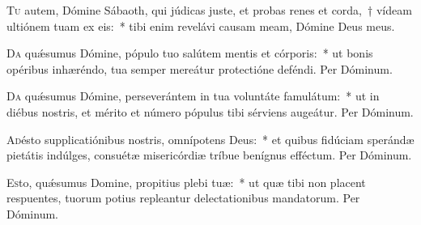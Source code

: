\documentclass[vesperale_romanum.tex]{subfiles}
\begin{document}



\lettrine{T}{u} autem, Dómine Sábaoth, qui júdicas juste, et probas renes et corda,~† vídeam ultiónem tuam ex eis:~* tibi enim revelávi causam meam, Dómine Deus meus.


\oratio

\lettrine{D}{a} quǽsumus Dómine, pópulo tuo salútem mentis et córporis:~* ut bonis opéribus inhæréndo, tua semper mereátur protectióne deféndi.
Per Dóminum.



\oratio

\lettrine{D}{a} quǽsumus Dómine, perseverántem in tua voluntáte famulátum:~* ut in diébus nostris, et mérito et número pópulus tibi sérviens augeátur.
Per Dóminum.



\oratio

\lettrine{A}{d}ésto supplicatiónibus nostris, omnípotens Deus:~* et quibus fidúciam sperándæ pietátis indúlges, consuétæ misericórdiæ tríbue benígnus efféctum. Per Dóminum.



\oratio

\lettrine{E}{s}to, quǽsumus Domine, propitius plebi tuæ:~* ut quæ tibi non placent respuentes, tuorum potius repleantur delectationibus mandatorum. Per Dóminum.



\end{document}
